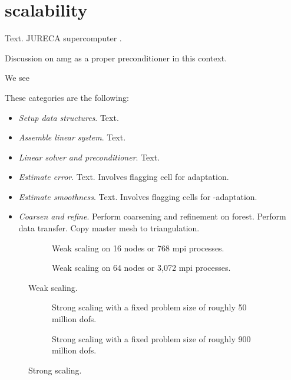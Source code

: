 \section{ scalability}
\label{sec:scaling}

Text. JURECA supercomputer \parencite{krause2016}.

Discussion on \gls{amg} as a proper preconditioner in this context.

We see

These categories are the following:
\begin{itemize}
\item \textit{Setup data structures}. Text.
\item \textit{Assemble linear system}. Text.
\item \textit{Linear solver and preconditioner}. Text.
\item \textit{Estimate error}. Text. Involves flagging cell for adaptation.
\item \textit{Estimate smoothness}. Text. Involves flagging cells for \hp-adaptation.
\item \textit{Coarsen and refine}. Perform coarsening and refinement on \pforest{} forest. Perform data transfer. Copy master mesh to \dealii{} triangulation.
\end{itemize}

\begin{figure}
\begin{subfigure}{1\textwidth}
  \centering
  
  \caption{Weak scaling on 16 nodes or 768 \gls{mpi} processes.}
  \label{fig:weak-nodes16}
\end{subfigure}
\begin{subfigure}{1\textwidth}
  \centering
  
  \caption{Weak scaling on 64 nodes or 3,072 \gls{mpi} processes.}
  \label{fig:weak-nodes64}
\end{subfigure}
\caption{Weak scaling.}
\label{fig:weak}
\end{figure}

\begin{figure}
\begin{subfigure}{1\textwidth}
  \centering
  
  \caption{Strong scaling with a fixed problem size of roughly 50 million \glspl{dof}.}
  \label{fig:strong-nrefs10}
\end{subfigure}
\begin{subfigure}{1\textwidth}
  \centering
  
  \caption{Strong scaling with a fixed problem size of roughly 900 million \glspl{dof}.}
  \label{fig:strong-nrefs12}
\end{subfigure}
\caption{Strong scaling.}
\label{fig:strong}
\end{figure}